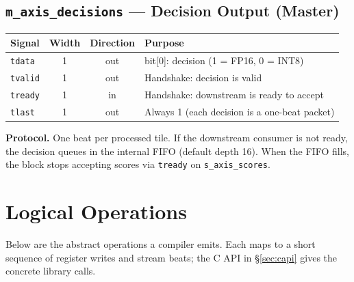 \documentclass[11pt]{article}
\begin{document}
\subsection{\texttt{m\_axis\_decisions} --- Decision Output (Master)}
\label{sec:m_axis_decisions}

\begin{table}[h]
\centering
\small
\begin{tabular}{@{}l c c p{8cm}@{}}
\toprule
Signal      & Width & Direction & Purpose \\
\midrule
\texttt{tdata}  & 1 & out & bit[0]: decision (1 = FP16, 0 = INT8) \\
\texttt{tvalid} & 1 & out & Handshake: decision is valid \\
\texttt{tready} & 1 & in  & Handshake: downstream is ready to accept \\
\texttt{tlast}  & 1 & out & Always 1 (each decision is a one-beat packet) \\
\bottomrule
\end{tabular}
\end{table}

\noindent\textbf{Protocol.} One beat per processed tile. If the downstream
consumer is not ready, the decision queues in the internal FIFO (default depth
16). When the FIFO fills, the block stops accepting scores via \texttt{tready}
on \texttt{s\_axis\_scores}.

\section{Logical Operations}
\label{sec:ops}

Below are the abstract operations a compiler emits. Each maps to a short
sequence of register writes and stream beats; the C API in \S\ref{sec:capi}
gives the concrete library calls.
\end{document}
